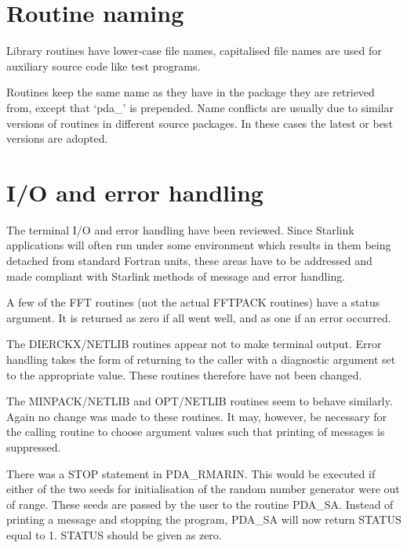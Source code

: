 \documentclass[11pt,twoside]{article}
\newcommand{\xlabel}[1]{}
\begin{document}

\section{\xlabel{routine_naming}Routine naming}

   Library routines have lower-case file names, capitalised file names
   are used for auxiliary source code like test programs.

   Routines keep the same name as they have in the package they are
   retrieved from, except that `pda\_' is prepended. Name conflicts are
   usually due to similar versions of routines in different source
   packages. In these cases the latest or best versions are adopted.


\section{\xlabel{io_and_error_handling}I/O and error handling}

   The terminal I/O and error handling have been reviewed. Since
   Starlink applications will often run under some environment which
   results in them being 
   detached from standard Fortran units, these areas have to be
   addressed and made compliant with Starlink methods of message and
   error handling.

   A few of the FFT routines (not the actual FFTPACK routines) have a
   status argument. It is returned as zero if all went well, and as one
   if an error occurred.

   The DIERCKX/NETLIB routines appear not to make terminal output. Error
   handling takes the form of returning to the caller with a diagnostic
   argument set to the appropriate value. These routines therefore have
   not been changed.

   The MINPACK/NETLIB and OPT/NETLIB routines seem to behave similarly.
   Again no change was made to these routines. It may, however, be
   necessary for the calling routine to choose argument values such that
   printing of messages is suppressed.

   There was a STOP statement in PDA\_RMARIN. This would be executed if
   either of the two seeds for initialisation of the random number
   generator were out of range. These seeds are passed by the user to
   the routine PDA\_SA. Instead of printing a message and stopping the
   program, PDA\_SA will now return STATUS equal to 1. STATUS should
   be given as zero.
\end{document}
